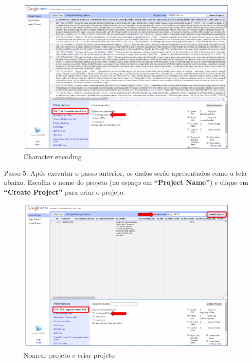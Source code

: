 \documentclass[12pt,hidelinks]{article}
\begin{document}
    \begin{figure}[!htp]
                \centering
                \includegraphics[scale=0.7]{figura/Figura187.png}
                \caption{Character  encoding}
            \label{Rotulo}
        \end{figure}
    
    \singlespacing

\newpage

    Passo 5: Após executar o passo anterior, os dados serão apresentados como a tela abaixo. Escolha o nome do projeto (no espaço em \textbf{“Project Name”}) e clique em \textbf{“Create Project”} para criar o projeto.
    
    \begin{figure}[!htp]
                \centering
                \includegraphics[scale=0.7]{figura/Figura188.png}
                \caption{Nomear projeto e criar projeto}
            \label{Rotulo}
        \end{figure}
    
\end{document}
